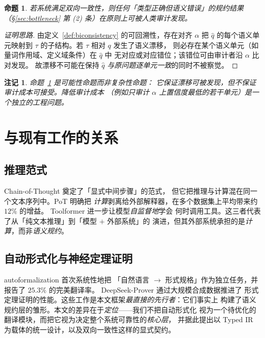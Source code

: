 \documentclass[UTF8,a4paper,11pt]{ctexart}
\newtheorem{proposition}{命题}[section]
\newtheorem{remark}{注记}[section]
\begin{document}
\begin{proposition}\label{prop:loss}
若系统满足双向一致性，则任何「类型正确但语义错误」的规约结果
（\S\ref{sec:bottleneck} 第 (2) 条）在原则上可被人类审计发现。
\end{proposition}

\begin{proof}[证明思路]
由定义~\ref{def:biconsistency} 的可回溯性，存在对齐 $\alpha$ 把 $\hat{q}$
的每个语义单元映射到 $\tau$ 的子结构。若 $\tau$ 相对 $q$ 发生了语义漂移，
则必存在某个语义单元（如量词作用域、定义域条件）在 $\hat{q}$ 中
无对应或对应错位；该错位可由审计者沿 $\alpha$ 比对发现。
故漂移不可能在保持 $\hat{q}$ \emph{与原问题逐单元一致}的同时不被察觉。
\end{proof}

\begin{remark}
命题~\ref{prop:loss} 是\emph{可能性}命题而非\emph{复杂性}命题：
它保证漂移\emph{可被发现}，但不保证审计成本可接受。降低审计成本
（例如只审计 $\alpha$ 上置信度最低的若干单元）是一个独立的工程问题。
\end{remark}

\section{与现有工作的关系}\label{sec:related}

\subsection{推理范式}

Chain-of-Thought \citep{wei2022cot} 奠定了「显式中间步骤」的范式，
但它把推理与计算混在同一个文本序列中。PoT \citep{chen2023pot} 明确把
\emph{计算}剥离给外部解释器，在多个数据集上平均带来约 $12\%$ 的增益。
Toolformer \citep{schick2023toolformer} 进一步让模型\emph{自监督地}学会
何时调用工具。这三者代表了从「纯文本推理」到「模型 $+$ 外部系统」的
演进，但其外部系统承担的是\emph{计算}，而非\emph{语义规约}。

\subsection{自动形式化与神经定理证明}

autoformalization \citep{wu2022autoformalization} 首次系统性地把
「自然语言 $\to$ 形式规格」作为独立任务，并报告了 $25.3\%$ 的完美翻译率。
DeepSeek-Prover \citep{xin2024deepseekprover} 通过大规模合成数据推进了
形式定理证明的性能。这些工作是本文框架\emph{最直接的先行者}：它们事实上
构建了语义规约层的雏形。本文的差异在于\emph{定位}——我们不把自动形式化
视为一个待优化的翻译模块，而把它视为决定整个系统可靠性的\emph{核心层}，
并据此提出以 Typed IR 为载体的统一设计，以及双向一致性这样的显式契约。
\end{document}
